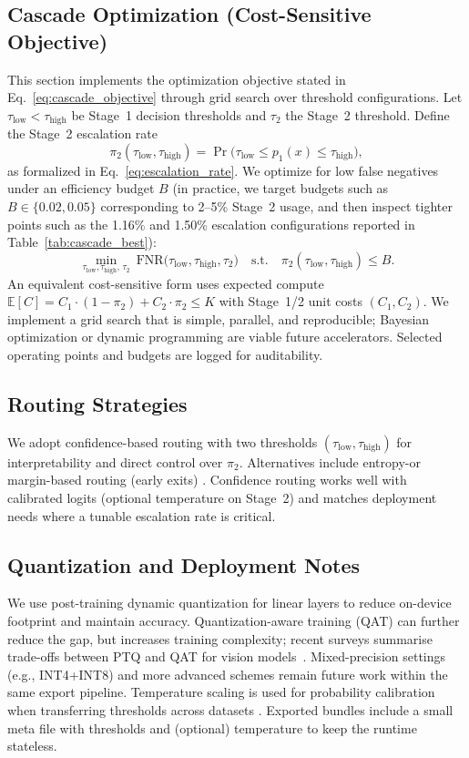 \subsection*{Cascade Optimization (Cost-Sensitive Objective)}
This section implements the optimization objective stated in Eq.~\ref{eq:cascade_objective} through grid search over threshold configurations. Let $\tau_{\mathrm{low}}<\tau_{\mathrm{high}}$ be Stage~1 decision thresholds and $\tau_2$ the Stage~2 threshold. Define the Stage~2 escalation rate
\[ \pi_2(\tau_{\mathrm{low}},\tau_{\mathrm{high}})=\Pr\big(\tau_{\mathrm{low}}\le p_1(x)\le\tau_{\mathrm{high}}\big), \]
as formalized in Eq.~\ref{eq:escalation_rate}. We optimize for low false negatives under an efficiency budget $B$ (in practice, we target budgets such as $B\in\{0.02,0.05\}$ corresponding to 2--5\% Stage~2 usage, and then inspect tighter points such as the 1.16\% and 1.50\% escalation configurations reported in Table~\ref{tab:cascade_best}):
\[
\min_{\tau_{\mathrm{low}},\tau_{\mathrm{high}},\,\tau_2}\ \mathrm{FNR}\big(\tau_{\mathrm{low}},\tau_{\mathrm{high}},\tau_2\big)\quad\text{s.t.}\quad \pi_2(\tau_{\mathrm{low}},\tau_{\mathrm{high}})\le B.
\]
An equivalent cost\hyp sensitive form uses expected compute $\mathbb{E}[C]=C_1\cdot(1-\pi_2)+C_2\cdot\pi_2\le K$ with Stage~1/2 unit costs $(C_1,C_2)$. We implement a grid search that is simple, parallel, and reproducible; Bayesian optimization or dynamic programming are viable future accelerators. Selected operating points and budgets are logged for auditability.

\subsection*{Routing Strategies}
We adopt confidence\hyp based routing with two thresholds $(\tau_{\mathrm{low}},\tau_{\mathrm{high}})$ for interpretability and direct control over $\pi_2$. Alternatives include entropy\hyp or margin\hyp based routing (early exits) \cite{kaya2019shallowdeep}. Confidence routing works well with calibrated logits (optional temperature on Stage~2) and matches deployment needs where a tunable escalation rate is critical.

\subsection*{Quantization and Deployment Notes}
We use post\hyp training dynamic quantization for linear layers to reduce on\hyp device footprint and maintain accuracy. Quantization\hyp aware training (QAT) can further reduce the gap, but increases training complexity; recent surveys summarise trade\hyp offs between PTQ and QAT for vision models~\cite{gholami2021quant_survey}. Mixed\hyp precision settings (e.g., INT4+INT8) and more advanced schemes remain future work within the same export pipeline. Temperature scaling is used for probability calibration when transferring thresholds across datasets \cite{guo2017calibration}. Exported bundles include a small meta file with thresholds and (optional) temperature to keep the runtime stateless.

